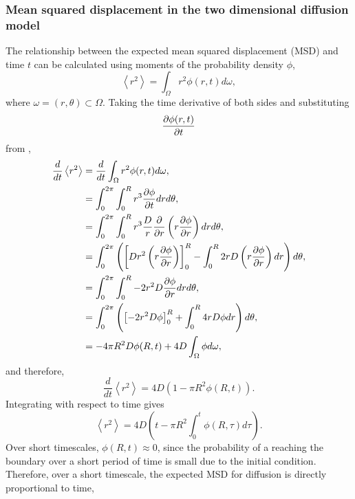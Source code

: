 \subsubsection{Mean squared displacement in the two dimensional diffusion model} \label{msd2d}
%
The relationship between the expected mean squared displacement (MSD) and time $t$
can be calculated using moments of the probability density $\phi$,
%
\begin{equation}
\left<r^2\right> = \int_{\Omega}r^2 \phi(r,t) d\omega ,
\label{eqn:MSD_expectation}
\end{equation}
%
where $\omega = (r,\theta) \subset \Omega$. Taking the time derivative of both
sides and substituting
\begin{equation}
    \frac{\partial \phi(r,t)}{\partial t}
\end{equation} from ,
%
\begin{align}
\frac{d}{dt} \left<r^2\right> &= \frac{d}{dt}\int_{\Omega}r^2 \phi(r,t) d\omega ,\\
                           &= \int_0^{2\pi} \int_0^{R} r^3 \frac{\partial \phi}{\partial t} dr d\theta ,\\
                            &= \int_0^{2\pi} \int_0^{R} r^3 \frac{D}{r} \frac{\partial }{\partial r } \left( r \frac{\partial  \phi}{\partial  r}\right) dr d\theta , \\
                            &= \int_0^{2\pi} \left( \left[ D r^2 \left( r \frac{\partial  \phi}{\partial  r}\right) \right]_0^{R} - \int_0^{R} 2rD \left(r \frac{\partial \phi}{\partial r} \right) dr \right) d\theta , \\
                            &= \int_0^{2\pi} \int_0^{R} -2r^2D \frac{\partial  \phi}{\partial r}dr d\theta , \\
                            &= \int_0^{2\pi} \left( \left[-2r^2D \phi \right]_0^{R} + \int_0^{R} 4rD \phi dr \right)d\theta , \\
                            &= - 4\pi R^2D \phi(R,t) + 4D \int_{\Omega} \phi d\omega ,
\label{eqn:diffusion_1}
\end{align}
%
and therefore,
\begin{equation}
\frac{d}{dt} \left<r^2\right>  = 4D( 1- \pi R^2 \phi(R,t)) .
\end{equation}
%
Integrating with respect to time gives
%
\begin{equation}
\left<r^2\right> = 4D \left( t - \pi R^2 \int_0^t \phi(R,\tau) d \tau \right).
\label{eqn:diffusion_msd}
\end{equation}
%
Over short timescales, $\phi(R,t) \approx 0$, since the probability of a reaching the boundary over a short period of time is small due to the initial condition. Therefore, over a short timescale, the expected MSD for diffusion is directly proportional to time,
